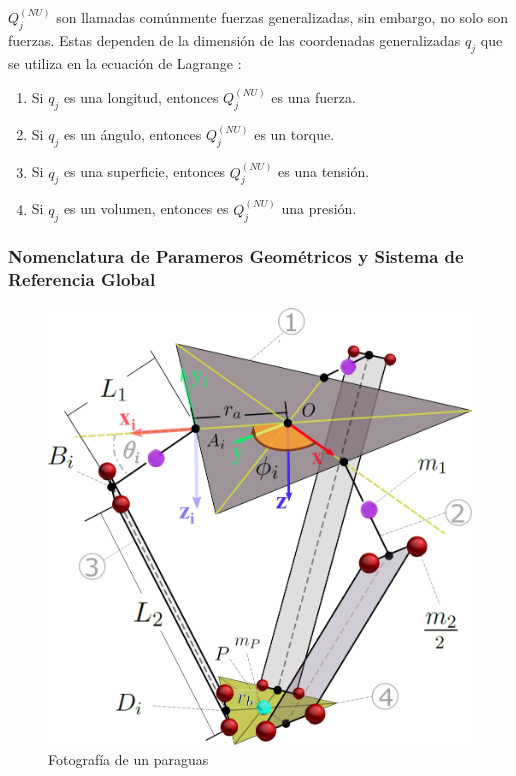     \newpage
    
    
     $ Q_{j}^{ \left( NU \right) }$ son llamadas comúnmente fuerzas generalizadas, sin embargo, no solo son fuerzas. Estas dependen de la dimensión de las coordenadas generalizadas  $ q_{j}$ que se utiliza en la ecuación de Lagrange :
    
    \begin{enumerate}
    	\item Si $q_{j}$  es una longitud, entonces $Q_{j}^{ \left( NU \right)}$  es una fuerza.
    	\item Si  $q_{j}$  es un ángulo, entonces  $Q_{j}^{ \left( NU \right) }$  es un torque.
        \item Si  $q_{j}$  es una superficie, entonces  $Q_{j}^{ \left( NU \right) }$ es una tensión.
    	\item Si $q_{j}$ es un volumen, entonces es $Q_{j}^{ \left( NU \right) }$ una presión.
    \end{enumerate}

    \newpage


    \subsubsection{Nomenclatura de Parameros Geométricos y Sistema de Referencia Global}
    
            \begin{figure}[htb]
                 \centering
                 \includegraphics[width=0.8\linewidth]{Main/Chapter4/Images4/DIBUJO23.jpg}
                  \caption{Fotografía de un paraguas}
                  \label{f:Cap4_Metodo_A_dina_1}
            \end{figure}    

